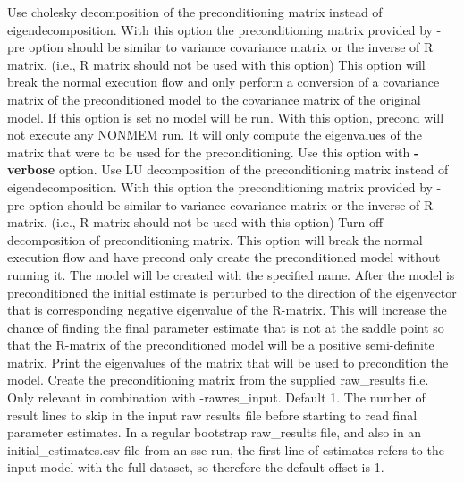 \begin{optionlist}
Use cholesky decomposition of the preconditioning matrix instead of eigendecomposition.  With this option the preconditioning matrix provided by -pre option should be similar to variance covariance matrix or the inverse of R matrix.  (i.e., R matrix should not be used with this option)
\nextopt
{}
This option will break the normal execution flow and only perform a conversion of a covariance matrix of the preconditioned model to the covariance matrix of the original model.
If this option is set no model will be run.
\nextopt
{}
With this option, precond will not execute any NONMEM run.  It will only compute the eigenvalues of the matrix that were to be used for the preconditioning.  Use this option with {\bf-verbose} option.
\nextopt	
{}
Use LU decomposition of the preconditioning matrix instead of eigendecomposition.  With this option the preconditioning matrix provided by -pre option should be similar to variance covariance matrix or the inverse of R matrix.  (i.e., R matrix should not be used with this option)
\nextopt
{}
Turn off decomposition of preconditioning matrix.
\nextopt
{}
This option will break the normal execution flow and have precond only create the preconditioned model without running it.
The model will be created with the specified name.
\nextopt
{}
After the model is preconditioned the initial estimate is perturbed to the direction of the eigenvector that is corresponding negative eigenvalue of the R-matrix.  This will increase the chance of finding the final parameter estimate that is not at the saddle point so that the R-matrix of the preconditioned model will be a positive semi-definite matrix.
\nextopt
{}
Print the eigenvalues of the matrix that will be used to precondition the model.
\nextopt
{}
Create the preconditioning matrix from the supplied raw\_results file.
\nextopt
{}
Only relevant in combination with -rawres\_input. Default 1. The number of result lines to skip in the input raw results file before starting to read final parameter estimates. In a regular bootstrap raw\_results file, and also in an initial\_estimates.csv file from an sse run, the first line of estimates refers to the input model with the full dataset, so therefore the default offset is 1.
\nextopt
{}

\end{optionlist}
